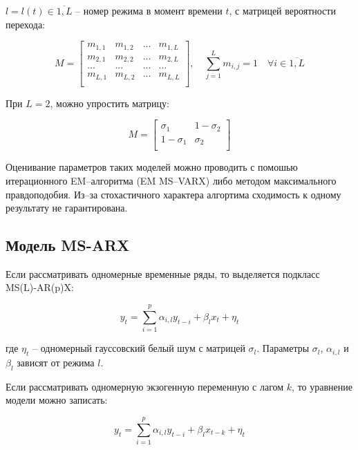 \documentclass[../report.tex]{subfiles}
\begin{document}
	$l=l(t) \in \overline{1,L}$ – номер режима в момент времени $t$, с матрицей вероятности перехода:
	
	\begin{equation}
	\label{eq:M_matrix}
	M=
	\left[ {\begin{array}{cccc}
		m_{1,1} & m_{1,2} & ... & m_{1,L} \\
		m_{2,1} & m_{2,2} & ... & m_{2,L} \\
		... & ... & ... & ... \\
		m_{L,1} & m_{L,2} & ... & m_{L,L} \\
		\end{array} } \right]
	, \quad
	\sum_{j=1}^{L} m_{i,j} = 1 \quad \forall i \in \overline{1,L}
	\end{equation}
	
	При $L=2$, можно упростить матрицу:
	
	\begin{equation}
	\label{eq:M_simplified}
	M=
	\left[ {\begin{array}{cc}
		\sigma_{1} & 1-\sigma_{2} \\
		1-\sigma_{1} & \sigma_{2} \\
		\end{array} } \right]
	\end{equation}
	
	Оценивание параметров таких моделей можно проводить с помошью итерационного EM–алгоритма (EM MS–VARX) \cite{malNovopMSVARX} либо методом максимального правдоподобия. Из–за стохастичного характера алгортима сходимость к одному результату не гарантирована.
	
	
	\subsection{Модель MS-ARX}
	
	Если рассматривать одномерные временные ряды, то выделяется подкласс MS(L)-AR(p)X:
	
	\begin{equation}  
	y_{t}=\sum_{i=1}^{p} \alpha_{i,l} y_{t-i} + \beta_{l} x_{t} + \eta_{t}
	\end{equation}
	
	где $\eta_{t}$ – одномерный гауссовский белый шум с матрицей $\sigma_{l}$. Параметры $\sigma_{l}$, $\alpha_{i,l}$ и $\beta_{l}$ зависят от режима $l$.
	
	Если рассматривать одномерную экзогенную переменную с лагом $k$, то уравнение модели можно записать:
	
	\begin{equation}  
	y_{t}=\sum_{i=1}^{p} \alpha_{i,l} y_{t-i} + \beta_{l} x_{t-k} + \eta_{t}
	\end{equation}
	
\end{document}
